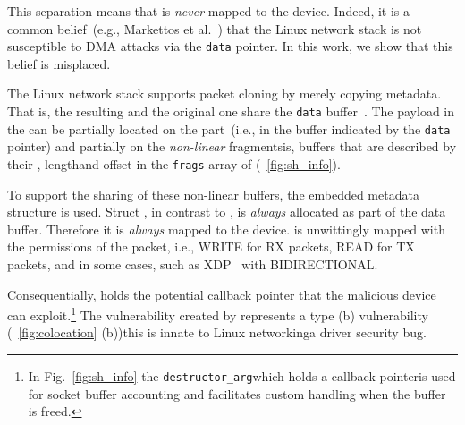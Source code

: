 This separation means that \skb{} is \emph{never} \DIFdelbegin {}\DIFdelend \DIFaddbegin {}\DIFaddend mapped to the device. Indeed, it is a common belief~(e.g., Markettos et al.~\cite{thunder}) \DIFdelbegin \DIFdel{, }\DIFdelend that the Linux network stack is not susceptible to DMA attacks via the \texttt{data} pointer. In this work, we show that this belief is misplaced.

The Linux network stack supports packet cloning by merely copying \skb{} metadata. That is, the resulting \skb{} and the original one share the \texttt{data} buffer~\cite{drivers2005linux}. The payload in the \skb{} can be partially located on the \emph{\DIFdelbegin {}\DIFdelend \DIFaddbegin {}\DIFaddend } part~(i.e., in the buffer indicated by the \texttt{data} pointer) and partially on the \emph{non-linear} fragments\DIFdelbegin {}\DIFdelend \DIFaddbegin {}\DIFaddend is, buffers that are described by their \page{}, length\DIFaddbegin \DIFadd{, }\DIFaddend and offset in the \texttt{frags} array of \shinfo{} (\DIFdelbegin {}\DIFdelend \DIFaddbegin {}\DIFaddend ~\ref{fig:sh_info}). 

To support the sharing of these non-linear buffers, the embedded \shinfo{} metadata structure is used.
Struct \shinfo{}, in contrast to \skb{}, is \emph{always} allocated as part of the data buffer. Therefore it is \emph{always} mapped to the device. \shinfo{} is unwittingly mapped with the permissions of the packet, i.e., WRITE for RX packets, READ for TX packets, and in some cases, such as XDP~\cite{xdp} with BIDIRECTIONAL.

Consequentially, \shinfo{} holds the potential callback pointer that the malicious device can exploit.\footnote{In Fig.~\ref{fig:sh_info} the \texttt{destructor\_arg}\DIFaddbegin \DIFadd{, }\DIFaddend which holds a callback pointer\DIFaddbegin \DIFadd{, }\DIFaddend is used for socket buffer accounting and facilitates custom handling when the buffer is freed.} The \subpage{} vulnerability created by \shinfo{} \DIFdelbegin \DIFdel{, }\DIFdelend represents a type (b) vulnerability (\DIFdelbegin {}\DIFdelend \DIFaddbegin {}\DIFaddend ~\ref{fig:colocation} (b))\DIFdelbegin {}\DIFdelend \DIFaddbegin \DIFadd{: }\DIFaddend this is innate to Linux networking\DIFdelbegin {}\DIFdelend \DIFaddbegin {}\DIFaddend a driver security bug. 

